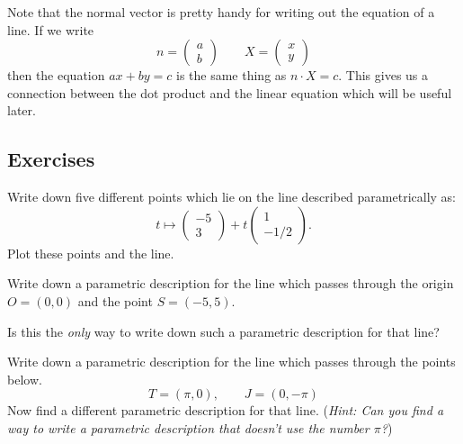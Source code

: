 \documentclass[elementsmain.tex]{subfiles}
\begin{document}
Note that the normal vector is pretty handy for writing out the equation of a line. If we write 
\[
n = \begin{pmatrix} a \\ b \end{pmatrix} \qquad X = \begin{pmatrix} x \\ y \end{pmatrix}
\]
then the equation $ax+by=c$ is the same thing as $n\cdot X = c$. This gives us a connection between the dot product and the linear equation which will be useful later.

\clearpage

\subsection*{Exercises}

\begin{exercise}
Write down five different points which lie on the line described parametrically as:
\[
t \mapsto \begin{pmatrix} -5\\3 \end{pmatrix} + t \begin{pmatrix}1\\-1/2\end{pmatrix}.
\]
Plot these points and the line.
\end{exercise}

\begin{exercise}\label{task:line-through-origin}
Write down a parametric description for the line which passes through the origin $O=(0,0)$ and the 
point $S = (-5,5)$.

Is this the \emph{only} way to write down such a parametric description for that line?
\end{exercise}

\begin{exercise}\label{task:line-through-points}
Write down a parametric description for the line which passes through the points below.
\[
 T = (\pi, 0), \qquad J = (0,-\pi)
\]
Now find a different parametric description for that line. (\emph{Hint: Can you find a way to write a parametric description that doesn't use the number $\pi$?})
\end{exercise}
\end{document}
